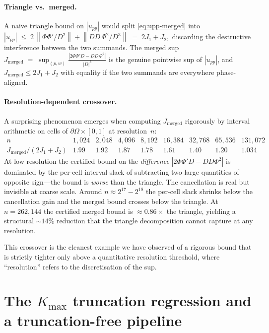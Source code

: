 \documentclass[11pt]{article}
\theoremstyle{definition}
\newcommand{\dOm}{\partial\Omega}
\newcommand{\norm}[1]{\left\lVert#1\right\rVert}
\begin{document}
\paragraph{Triangle vs.\ merged.}
A naive triangle bound on $|u_{pp}|$ would split \eqref{eq:upp-merged} into
\(
   |u_{pp}|
   \;\le\;
   2\,\norm{\Phi\Phi'/D^2} + \norm{DD\,\Phi^2/D^3}
   \;=\;
   2 J_1 + J_2,
\)
discarding the destructive interference between the two summands. The merged sup
\(
   J_{\mathrm{merged}}
   \;=\;
   \sup_{(p,w)} \frac{ |2\Phi\Phi'D - DD\,\Phi^2| }{ |D|^3 }
\)
is the genuine pointwise sup of $|u_{pp}|$, and $J_{\mathrm{merged}} \le 2J_1+J_2$
with equality if the two summands are everywhere phase-aligned.

\paragraph{Resolution-dependent crossover.}
A surprising phenomenon emerges when computing $J_{\mathrm{merged}}$ rigorously by
interval arithmetic on cells of $\dOm \times [0,1]$ at resolution~$n$:
\[
\begin{array}{c|cccccccc}
   n & 1{,}024 & 2{,}048 & 4{,}096 & 8{,}192 & 16{,}384 & 32{,}768 & 65{,}536 & 131{,}072 \\\hline
   J_{\mathrm{merged}}/(2J_1+J_2) & 1.99 & 1.92 & 1.87 & 1.78 & 1.61 & 1.40 & 1.20 & 1.034
\end{array}
\]
At low resolution the certified bound on the \emph{difference} $|2\Phi\Phi'D-DD\Phi^2|$
is dominated by the per-cell interval slack of subtracting two large quantities of
opposite sign---the bound is \emph{worse} than the triangle. The cancellation is real
but invisible at coarse scale. Around $n\approx 2^{17}\!-\!2^{18}$ the per-cell slack
shrinks below the cancellation gain and the merged bound crosses below the triangle.
At $n=262{,}144$ the certified merged bound is $\approx 0.86\times$ the triangle,
yielding a structural $\sim 14\%$ reduction that the triangle decomposition cannot
capture at any resolution.

This crossover is the cleanest example we have observed of a rigorous bound that is
strictly tighter only above a quantitative resolution threshold, where ``resolution''
refers to the discretisation of the sup.

\bigskip

\section{The $K_{\max}$ truncation regression and a truncation-free pipeline}\label{sec:trunc-free}
\end{document}
